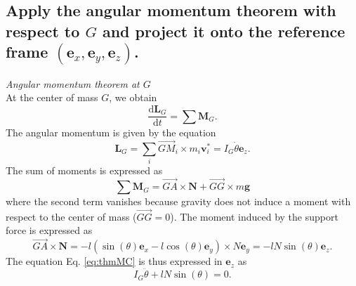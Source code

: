 \documentclass[11pt,a4paper]{exam}
\newcommand{\exACDH}{\bm e_x}
\newcommand{\eyACDH}{\bm e_y}
\newcommand{\ezACDH}{\bm e_z}
\begin{document}
\begin{parts}
\part{Apply the angular momentum theorem with respect to $G$ and project it onto the reference frame $(\exACDH, \eyACDH, \ezACDH)$.}
    \par\vspace{2mm}
    {\textit{Angular momentum theorem at $G$}}\\
    At the center of mass $G$, we obtain
    \begin{equation}
         \frac{\mathrm d \bm{L}_G}{\mathrm d t} = \sum \bm M_G.\label{eq:thmMC}
    \end{equation}
    The angular momentum is given by the equation
    \begin{equation}
        \bm L_G = \sum_i \overrightarrow{GM}_i \times m_i \bm v_i^*= I_G \dot\theta \ezACDH.
    \end{equation}
    The sum of moments is expressed as
    \begin{equation}
        \sum \bm M_G = \overrightarrow{GA}\times \bm N + \overrightarrow{GG}\times m\bm g
    \end{equation}
    where the second term vanishes because gravity does not induce a moment with respect to the center of mass ($\overrightarrow{GG}=0$).
    The moment induced by the support force is expressed as
    \begin{equation}
      \overrightarrow{GA}\times \bm N = -l(\sin(\theta)\exACDH - l\cos(\theta) \eyACDH)\times N\eyACDH= -lN\sin(\theta) \ezACDH.
    \end{equation}
    The equation Eq. \eqref{eq:thmMC} is thus expressed in $\ezACDH$ as
    \begin{equation}
        I_G \ddot\theta + lN\sin(\theta) = 0.\label{eq:thmMC_ez}
    \end{equation}

\end{parts}
\end{document}
